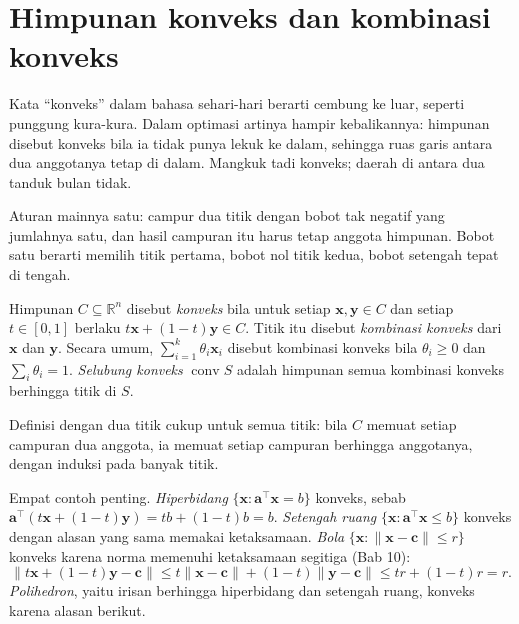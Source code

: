 \section{Himpunan konveks dan kombinasi konveks}

Kata ``konveks'' dalam bahasa sehari-hari berarti cembung ke luar, seperti punggung
kura-kura. Dalam optimasi artinya hampir kebalikannya: himpunan disebut konveks bila ia
tidak punya lekuk ke dalam, sehingga ruas garis antara dua anggotanya tetap di dalam.
Mangkuk tadi konveks; daerah di antara dua tanduk bulan tidak.

Aturan mainnya satu: campur dua titik dengan bobot tak negatif yang jumlahnya satu, dan
hasil campuran itu harus tetap anggota himpunan. Bobot satu berarti memilih titik pertama, bobot
nol titik kedua, bobot setengah tepat di tengah.


\begin{definisi}
Himpunan $C\subseteq\mathbb{R}^{n}$ disebut \emph{konveks} bila untuk setiap
$\mathbf{x},\mathbf{y}\in C$ dan setiap $t\in[0,1]$ berlaku
$t\mathbf{x}+(1-t)\mathbf{y}\in C$. Titik itu disebut \emph{kombinasi konveks} dari
$\mathbf{x}$ dan $\mathbf{y}$. Secara umum, $\sum_{i=1}^{k}\theta_{i}\mathbf{x}_{i}$
disebut kombinasi konveks bila $\theta_{i}\ge0$ dan $\sum_{i}\theta_{i}=1$.
\emph{Selubung konveks} $\operatorname{conv}S$ adalah himpunan semua kombinasi konveks
berhingga titik di $S$.
\end{definisi}

Definisi dengan dua titik cukup untuk semua titik: bila $C$ memuat setiap campuran dua
anggota, ia memuat setiap campuran berhingga anggotanya, dengan induksi pada banyak
titik.

Empat contoh penting. \emph{Hiperbidang}
$\{\mathbf{x}:\mathbf{a}^{\top}\mathbf{x}=b\}$ konveks, sebab
$\mathbf{a}^{\top}(t\mathbf{x}+(1-t)\mathbf{y})=tb+(1-t)b=b$. \emph{Setengah ruang}
$\{\mathbf{x}:\mathbf{a}^{\top}\mathbf{x}\le b\}$ konveks dengan alasan yang sama memakai
ketaksamaan. \emph{Bola} $\{\mathbf{x}:\|\mathbf{x}-\mathbf{c}\|\le r\}$ konveks karena
norma memenuhi ketaksamaan segitiga (Bab 10):
\[
  \|t\mathbf{x}+(1-t)\mathbf{y}-\mathbf{c}\|
  \le t\|\mathbf{x}-\mathbf{c}\|+(1-t)\|\mathbf{y}-\mathbf{c}\|\le tr+(1-t)r=r .
\]
\emph{Polihedron}, yaitu irisan berhingga hiperbidang dan setengah ruang, konveks karena
alasan berikut.


